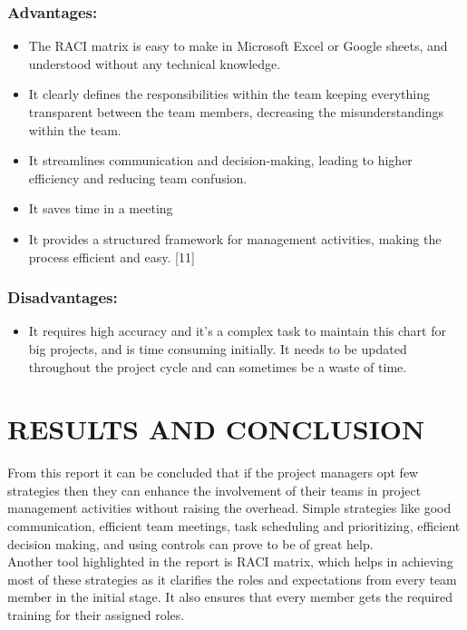 \documentclass[a4paper,12pt]{article}
\begin{document}
\subsubsection {Advantages:} 
\begin{itemize}
\item The RACI matrix is easy to make in Microsoft Excel or Google sheets,  and understood without any technical knowledge.
\item It clearly defines the responsibilities within the team keeping everything transparent between the team members, decreasing the misunderstandings within the team.
\item It streamlines communication and decision-making, leading to higher efficiency and reducing team confusion.
\item It saves time in a meeting
\item It provides a structured framework for management activities, making the process efficient and easy.    [11]
\end{itemize}


\subsubsection {Disadvantages:}
\begin{itemize}
\item It requires high accuracy and it’s a complex task to maintain this chart for big projects, and is time consuming initially. It needs to be updated throughout the project cycle and can sometimes be a waste of time.
\end{itemize}



\newpage
\section{RESULTS AND CONCLUSION}
From this report it can be concluded that if the project managers opt few strategies then they can enhance the involvement of their teams in project management activities without raising the overhead. Simple strategies like good communication, efficient team meetings, task scheduling and prioritizing, efficient decision making, and using controls can prove to be of great help.
\\
Another tool highlighted in the report is RACI matrix, which helps in achieving most of these strategies as it clarifies the roles and expectations from every team member in the initial stage. It also ensures that every member gets the required training for their assigned roles.
\end{document}
